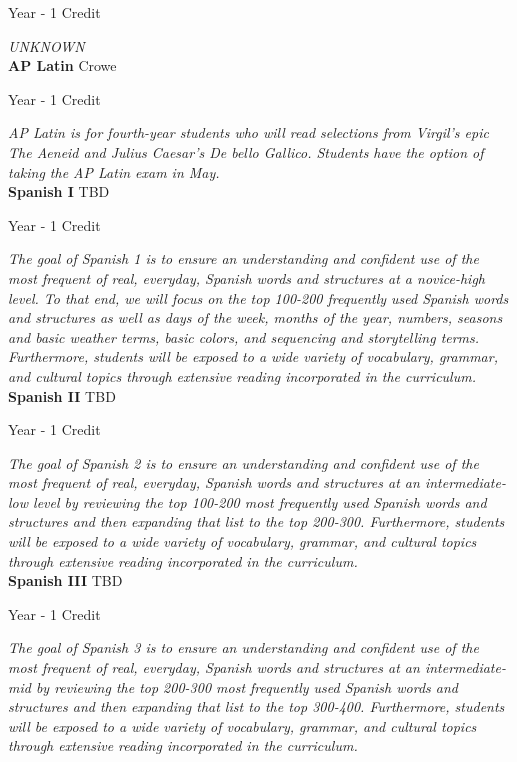 \noindent Year - 1 Credit

\vspace{1mm}\emph{UNKNOWN}\\


\noindent\textbf{AP Latin} \hfill Crowe

\noindent Year - 1 Credit

\vspace{1mm}\emph{AP Latin is for fourth-year students who will read selections from Virgil's epic The Aeneid and Julius Caesar's De bello Gallico. Students have the option of taking the AP Latin exam in May.}\\


\noindent\textbf{Spanish I} \hfill TBD

\noindent Year - 1 Credit

\vspace{1mm}\emph{The goal of Spanish 1 is to ensure an understanding and confident use of the most frequent of real, everyday, Spanish words and structures at a novice-high level.  To that end, we will focus on the top 100-200 frequently used Spanish words and structures as well as days of the week, months of the year, numbers, seasons and basic weather terms, basic colors, and sequencing and storytelling terms.  Furthermore, students will be exposed to a wide variety of vocabulary, grammar, and cultural topics through extensive reading incorporated in the curriculum.}\\


\noindent\textbf{Spanish II} \hfill TBD

\noindent Year - 1 Credit

\vspace{1mm}\emph{The goal of Spanish 2 is to ensure an understanding and confident use of the most frequent of real, everyday, Spanish words and structures at an intermediate-low level by reviewing the top 100-200 most frequently used Spanish words and structures and then expanding that list to the top 200-300.  Furthermore, students will be exposed to a wide variety of vocabulary, grammar, and cultural topics through extensive reading incorporated in the curriculum.}\\


\noindent\textbf{Spanish III} \hfill TBD

\noindent Year - 1 Credit

\vspace{1mm}\emph{The goal of Spanish 3 is to ensure an understanding and confident use of the most frequent of real, everyday, Spanish words and structures at an intermediate-mid by reviewing the top 200-300 most frequently used Spanish words and structures and then expanding that list to the top 300-400.  Furthermore, students will be exposed to a wide variety of vocabulary, grammar, and cultural topics through extensive reading incorporated in the curriculum.}\\


